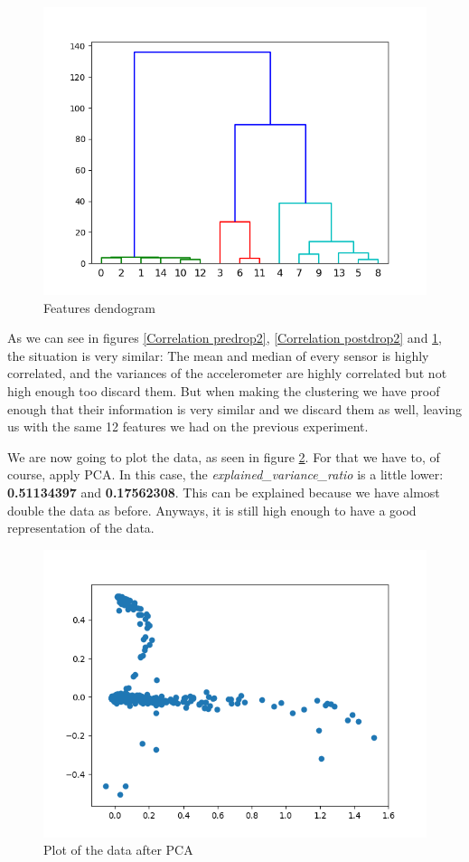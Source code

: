 \documentclass[idxtotoc,hyperref,openany]{labbook} %
\begin{document}
\begin{figure}[h]
\includegraphics[width=0.9\linewidth]{Features_Dendogram_Day2.png}
\setlength\belowcaptionskip{-10pt}
\caption{Features dendogram}
\label{Clustering features2}
\end{figure}

As we can see in figures \ref{Correlation predrop2}, \ref{Correlation postdrop2} and \ref{Clustering features2}, the situation is very similar: The mean and median of every sensor is highly correlated, and the variances of the accelerometer are highly correlated but not high enough too discard them. But when making the clustering we have proof enough that their information is very similar and we discard them as well, leaving us with the same 12 features we had on the previous experiment.

We are now going to plot the data, as seen in figure \ref{data plot 2 Selected}. For that we have to, of course, apply PCA. In this case, the \textit{explained\_variance\_ratio} is a little lower: \textbf{0.51134397} and \textbf{0.17562308}. This can be explained because we have almost double the data as before. Anyways, it is still high enough to have a good representation of the data.

\begin{figure}[h]
\includegraphics[width=0.9\linewidth]{PCA_Plot_Accelerometer_Day2_Selected.png}
\setlength\belowcaptionskip{-10pt}
\caption{Plot of the data after PCA}
\label{data plot 2 Selected}
\end{figure}
\end{document}
